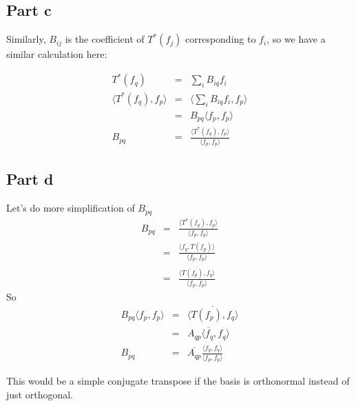 \subsection*{Part c}
Similarly, $ B_{ij} $ is the coefficient of $ T^*(f_j)$ corresponding to $ f_i $, so we have a similar calculation here:

\begin{eqnarray*}
                       T^*(f_q) &=& \sum\limits_i B_{iq} f_i \\
  \langle T^*(f_q), f_p \rangle &=& \langle \sum\limits_i B_{iq} f_i, f_p \rangle \\
                                &=& B_{pq}\langle f_p, f_p \rangle \\
                         B_{pq} &=& \frac{\langle T^*(f_q), f_p \rangle}{\langle f_p, f_p \rangle}
\end{eqnarray*}

\subsection*{Part d}
Let's do more simplification of $ B_{pq} $
\begin{eqnarray*}
   B_{pq} &=& \frac{\langle T^*(f_q), f_p \rangle}{\langle f_p, f_p \rangle} \\
          &=& \frac{\langle f_q, T(f_p) \rangle}{\langle f_p, f_p \rangle} \\
          &=& \frac{\overline{\langle T(f_p), f_q \rangle}}{\langle f_p, f_p \rangle}
\end{eqnarray*}
So 
\begin{eqnarray*}
   B_{pq}\langle f_p, f_p \rangle &=& \overline{\langle T(f_p), f_q \rangle} \\
                                  &=& \overline {A_{qp}\langle f_q, f_q \rangle} \\
                           B_{pq} &=& \overline {A_{qp}}\frac{\langle f_q, f_q \rangle}{\langle f_p, f_p \rangle}
\end{eqnarray*}

This would be a simple conjugate transpose if the basis is orthonormal instead of just orthogonal.